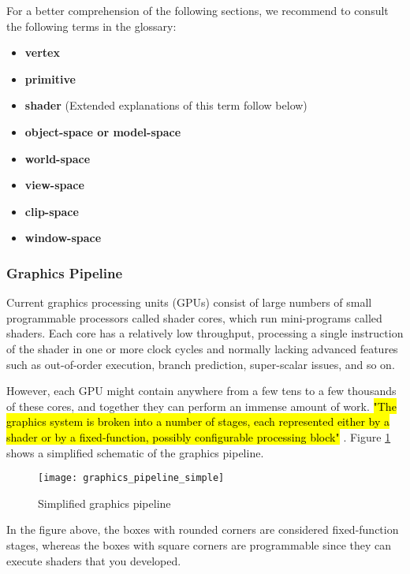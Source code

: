 
For a better comprehension of the following sections, we recommend to consult the following terms in the glossary:
\begin{itemize}
	\item \textbf{\Gls{vertex}}
	\item \textbf{\Gls{primitive}}
	\item \textbf{\Gls{shader}} (Extended explanations of this term follow below)
	\item \textbf{\gls{object-space} or \gls{model-space}}
	\item \textbf{\gls{world-space}}
	\item \textbf{\gls{view-space}}
	\item \textbf{\gls{clip-space}}
	\item \textbf{\gls{window-space}}
\end{itemize}


\subsubsection{Graphics Pipeline} \label{graphis-pipeline}
Current graphics processing units (GPUs) consist of large numbers of small programmable processors called shader cores, which run mini-programs called \glspl{shader}. Each core has a relatively low throughput, processing a single instruction of the shader in one or more clock cycles and normally lacking advanced features such as out-of-order execution, branch prediction, super-scalar issues, and so on.

 However, each GPU might contain anywhere from a few tens to a few thousands of these cores, and together they can perform an immense amount of work. \hl{"The graphics system is broken into a number of stages, each represented either by a shader or by a fixed-function, possibly configurable processing block"} \cite{superbible}. Figure \ref{fig:graphics_pipeline_simple} shows a simplified schematic of the graphics pipeline.

\begin{figure}[h!]
	\centering
	\texttt{[image: graphics\_pipeline\_simple]}
	\caption{Simplified graphics pipeline \cite{superbible}}
	\label{fig:graphics_pipeline_simple}
\end{figure}

In the figure above, the boxes with rounded corners are considered fixed-function stages, whereas the boxes with square corners are programmable since they can execute \glspl{shader} that you developed.

